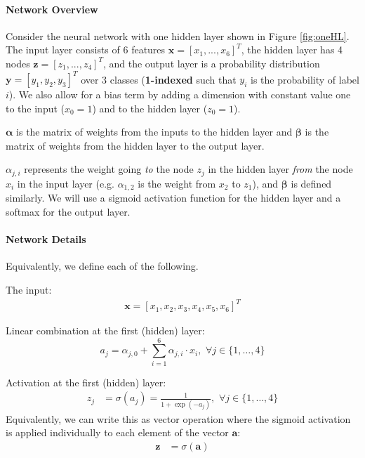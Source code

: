 \documentclass[11pt,addpoints,answers]{exam}
\newcommand{\av}{\mathbf{a}}
\newcommand{\xv}{\mathbf{x}}
\newcommand{\yv}{\mathbf{y}}
\newcommand{\zv}{\mathbf{z}}
\begin{document}
\paragraph{Network Overview}
Consider the neural network with one hidden layer shown in Figure \ref{fig:oneHL}. The input layer consists of 6 features $\xv = [x_1,...,x_6]^T$, the hidden layer has 4  nodes $\zv = [z_1,...,z_4]^T$, and the output layer is a probability distribution $\yv = [y_1, y_2, y_3]^T$ over 3 classes (\textbf{1-indexed} such that $y_i$ is the probability of label $i$). We also allow for a bias term by adding a dimension with constant value one to the input ($x_0 = 1$) and to the hidden layer ($z_0 = 1$).

$\boldsymbol{\alpha}$ is the matrix of weights from the inputs to the hidden layer and $\boldsymbol{\beta}$ is the matrix of weights from the hidden layer to the output layer. 

$\alpha_{j,i}$ represents the weight going \textit{to} the node $z_j$ in the hidden layer \textit{from} the node $x_i$ in the input layer (e.g. $\alpha_{1,2}$ is the weight from $x_2$ to $z_1$), and $\boldsymbol{\beta}$ is defined similarly. We will use a sigmoid activation function for the hidden layer and a softmax for the output layer. \\

\paragraph{Network Details}

Equivalently, we define each of the following. 

The input:
\begin{align}
\label{eqn:x}
\xv=[x_1,x_2,x_3,x_4,x_5,x_6]^T
\end{align}

Linear combination at the first (hidden) layer:
\begin{equation}
\label{eqn:a}
a_j= \alpha_{j,0} + \sum_{i=1}^6 \alpha_{j,i}\cdot x_i,\,\, \forall j \in \{1,\ldots,4\}
\end{equation}

Activation at the first (hidden) layer:
\begin{align}
\label{eqn:z}
z_j &= \sigma(a_j) = \frac{1}{1+\exp(-a_j)},\,\, \forall j \in \{1,\ldots,4\}
\end{align}
Equivalently, we can write this as vector operation where the sigmoid activation is applied individually to each element of the vector $\av$:
\begin{align}
\label{eqn:zv}
\zv &= \sigma(\av)
\end{align}
\end{document}

